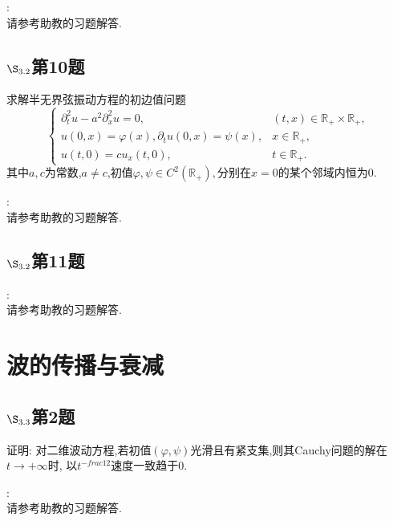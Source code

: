\documentclass[12pt, a4paper]{ctexbook}
\begin{document}
    \songti{}:\\
    
    请参考助教的习题解答.
    
    
    
    \subsection{$\S_{3.2}$第10题}
    \kaishu{}
    
    求解半无界弦振动方程的初边值问题
    $$\begin{cases}
    \partial_t^2 u - a^2 \partial_x^2 u = 0, & (t,x)\in \mathbb R_+\times \mathbb R_+,\\
    u(0, x) = \varphi(x), \partial_t u(0, x) = \psi(x), & x \in \mathbb R_+,\\
    u(t, 0) = c u_x(t, 0), & t\in \mathbb R_+.
    \end{cases}$$
    其中$a,c$为常数,$a\neq c$,初值$\varphi,\psi \in C^2(\mathbb R_+),$分别在$x=0$的某个邻域内恒为0.
    
    \songti{}:\\
    
    请参考助教的习题解答.
    
    
    
    \subsection{$\S_{3.2}$第11题}
    \kaishu{}
    
    \songti{}:\\
    
    请参考助教的习题解答.
    
    \section{波的传播与衰减}
    
    
    \subsection{$\S_{3.3}$第2题}
    \kaishu{}
    
    证明: 对二维波动方程,若初值$(\varphi, \psi)$光滑且有紧支集,则其Cauchy问题的解在$t\rightarrow+\infty$时, 以$t^{-frac12}$速度一致趋于0.
    
    \songti{}:\\
    
    请参考助教的习题解答.
    
\end{document}
